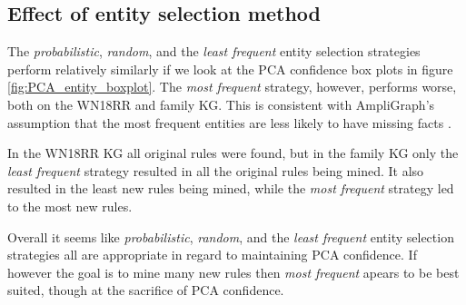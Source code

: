 \fi

\newpage
\subsection{Effect of entity selection method}
The \textit{probabilistic}, \textit{random}, and the \textit{least frequent} entity selection strategies perform relatively similarly if we look at the PCA confidence box plots in figure \ref{fig:PCA_entity_boxplot}. The \textit{most frequent} strategy, however, performs worse, both on the WN18RR and family KG. This is consistent with AmpliGraph's assumption that the most frequent entities are less likely to have missing facts \cite{kge_tutorial}.

In the WN18RR KG all original rules were found, but in the family KG only the \textit{least frequent} strategy resulted in all the original rules being mined. It also resulted in the least new rules being mined, while the \textit{most frequent} strategy led to the most new rules.

Overall it seems like \textit{probabilistic}, \textit{random}, and the \textit{least frequent} entity selection strategies all are appropriate in regard to maintaining PCA confidence. If however the goal is to mine many new rules then \textit{most frequent} apears to be best suited, though at the sacrifice of PCA confidence.


